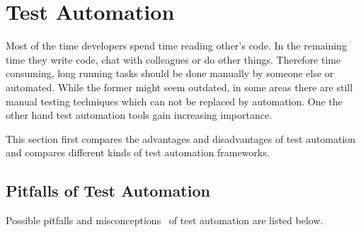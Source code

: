 \documentclass[12pt, notitlepage]{article}
\begin{document}
\section{Test Automation}
Most of the time developers spend time reading other's code. In the remaining time they write code, chat with colleagues or do other things.
Therefore time consuming, long running tasks should be done manually by someone else or automated.
While the former might seem outdated, in some areas there are still manual testing techniques which can not be replaced by automation.
One the other hand test automation tools gain increasing importance.

This section first compares the advantages and disadvantages of test automation and compares different kinds of test automation frameworks.
\subsection{Pitfalls of Test Automation}
Possible pitfalls and misconceptions~\cite{test-automation-success} of test automation are listed below.
\end{document}
